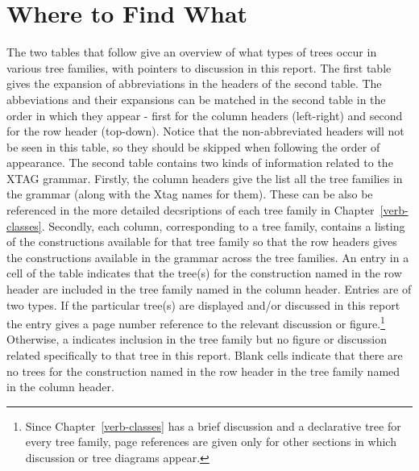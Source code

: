 \chapter{Where to Find What}
\label{table-intro}

The two tables that follow give an overview of what types of trees occur in
various tree families, with pointers to discussion in this report.  The
first table gives the expansion of abbreviations in the headers of the
second table. The abbeviations and their expansions can be matched in the
second table in the order in which they appear - first for the column
headers (left-right) and second for the row header (top-down). Notice that
the non-abbreviated headers will not be seen in this table, so they should
be skipped when following the order of appearance. The second table
contains two kinds of information related to the XTAG grammar. Firstly, the
column headers give the list all the tree families in the grammar (along
with the {\sc Xtag} names for them). These can be also be referenced in the
more detailed decsriptions of each tree family in
Chapter~\ref{verb-classes}. Secondly, each column, corresponding to a tree
family, contains a listing of the constructions available for that tree
family so that the row headers gives the constructions available in the
grammar across the tree families. An entry in a cell of the table indicates
that the tree(s) for the construction named in the row header are included
in the tree family named in the column header. Entries are of two types.
If the particular tree(s) are displayed and/or discussed in this report the
entry gives a page number reference to the relevant discussion or
figure.\footnote{Since Chapter~\ref{verb-classes} has a brief discussion
and a declarative tree for every tree family, page references are given
only for other sections in which discussion or tree diagrams appear.}
Otherwise, a \xtagcheck \space indicates inclusion in the tree family but
no figure or discussion related specifically to that tree in this report.
Blank cells indicate that there are no trees for the construction named in
the row header in the tree family named in the column header.




\vspace{0.3in}

